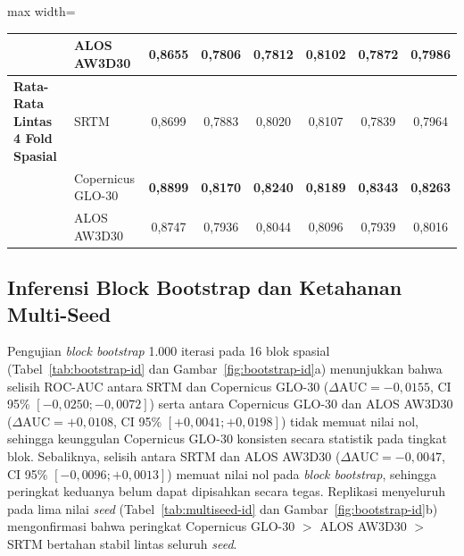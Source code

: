 \documentclass[11pt,twoside]{article}
\begin{document}
\begin{table}[!htbp]
\begin{adjustbox}{max width=\textwidth}
\begin{tabular}{c c c c l cccccc}
  & & & & ALOS AW3D30 & 0,8655 & 0,7806 & 0,7812 & 0,8102 & 0,7872 & 0,7986 \\
\midrule
\multicolumn{4}{l}{\textbf{Rata-Rata Lintas 4 Fold Spasial}} & SRTM & 0,8699 & 0,7883 & 0,8020 & 0,8107 & 0,7839 & 0,7964 \\
\multicolumn{4}{l}{} & Copernicus GLO-30 & \textbf{0,8899} & \textbf{0,8170} & \textbf{0,8240} & \textbf{0,8189} & \textbf{0,8343} & \textbf{0,8263} \\
\multicolumn{4}{l}{} & ALOS AW3D30 & 0,8747 & 0,7936 & 0,8044 & 0,8096 & 0,7939 & 0,8016 \\
\bottomrule
\end{tabular}
\end{adjustbox}
\end{table}

\subsection{Inferensi Block Bootstrap dan Ketahanan Multi-Seed}\label{subsec:bootstrap-id}

Pengujian \textit{block bootstrap} 1.000 iterasi pada 16 blok spasial (Tabel~\ref{tab:bootstrap-id} dan Gambar~\ref{fig:bootstrap-id}a) menunjukkan bahwa selisih ROC-AUC antara SRTM dan Copernicus GLO-30 ($\Delta\text{AUC} = -0{,}0155$, CI 95\% $[-0{,}0250; -0{,}0072]$) serta antara Copernicus GLO-30 dan ALOS AW3D30 ($\Delta\text{AUC} = +0{,}0108$, CI 95\% $[+0{,}0041; +0{,}0198]$) tidak memuat nilai nol, sehingga keunggulan Copernicus GLO-30 konsisten secara statistik pada tingkat blok. Sebaliknya, selisih antara SRTM dan ALOS AW3D30 ($\Delta\text{AUC} = -0{,}0047$, CI 95\% $[-0{,}0096; +0{,}0013]$) memuat nilai nol pada \textit{block bootstrap}, sehingga peringkat keduanya belum dapat dipisahkan secara tegas. Replikasi menyeluruh pada lima nilai \textit{seed} (Tabel~\ref{tab:multiseed-id} dan Gambar~\ref{fig:bootstrap-id}b) mengonfirmasi bahwa peringkat Copernicus GLO-30 $>$ ALOS AW3D30 $>$ SRTM bertahan stabil lintas seluruh \textit{seed}.
\end{document}
